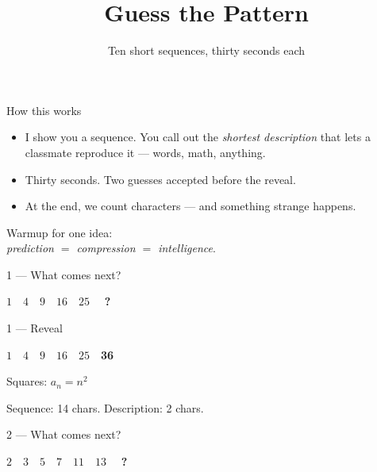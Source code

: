 \documentclass[aspectratio=169, 12pt, xcolor={dvipsnames}]{beamer}
\title{Guess the Pattern}
\subtitle{Ten short sequences, thirty seconds each}
\date{}
\newcommand{\seq}[1]{{\huge\ttfamily #1}}
\newcommand{\blank}{\textcolor{accent}{\textbf{?}}}
\newcommand{\ans}[1]{\textcolor{accent}{\textbf{#1}}}
\newcommand{\hintline}[1]{\vfill\begin{center}\small\textcolor{hint}{#1}\end{center}}
\begin{document}
\maketitle

\begin{frame}{How this works}
\large
\begin{itemize}
  \item I show you a sequence. You call out the \emph{shortest description} that lets a classmate reproduce it --- words, math, anything.
  \item Thirty seconds. Two guesses accepted before the reveal.
  \item At the end, we count characters --- and something strange happens.
\end{itemize}
\vfill
\begin{center}
\textcolor{hint}{Warmup for one idea:\\
\emph{prediction $=$ compression $=$ intelligence}.}
\end{center}
\end{frame}

\begin{frame}{1 --- What comes next?}
\vfill
\begin{center}\seq{$1 \quad 4 \quad 9 \quad 16 \quad 25 \quad$ \blank}\end{center}
\vfill
\end{frame}

\begin{frame}{1 --- Reveal}
\vfill
\begin{center}\seq{$1 \quad 4 \quad 9 \quad 16 \quad 25 \quad $\ans{36}}\end{center}
\vfill
\begin{center}\Large Squares: $a_n = n^2$\end{center}
\hintline{Sequence: 14 chars. \quad Description: 2 chars.}
\end{frame}

\begin{frame}{2 --- What comes next?}
\vfill
\begin{center}\seq{$2 \quad 3 \quad 5 \quad 7 \quad 11 \quad 13 \quad$ \blank}\end{center}
\vfill
\end{frame}
\end{document}
